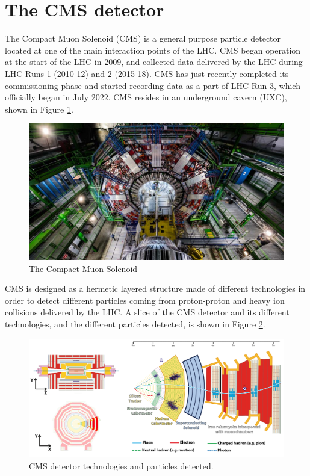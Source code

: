 
\section{The CMS detector} \label{sec:CMS}

The Compact Muon Solenoid (CMS) is a general purpose particle detector located at one of the main interaction points of the LHC. CMS began operation at the start of the LHC in 2009, and collected data delivered by the LHC during LHC Runs 1 (2010-12) and 2 (2015-18). CMS has just recently completed its commissioning phase and started recording data as a part of LHC Run 3, which officially began in July 2022. CMS resides in an underground cavern (UXC), shown in Figure \ref{fig:CMS_image}.

\begin{figure}[H]
    \centering
    \includegraphics[width=\textwidth]{Images/CMS/CMS.jpg}
    \caption{The Compact Muon Solenoid}
    \label{fig:CMS_image}
\end{figure}

CMS is designed as a hermetic layered structure made of different technologies in order to detect different particles coming from proton-proton and heavy ion collisions delivered by the LHC. A slice of the CMS detector and its different technologies, and the different particles detected, is shown in Figure \ref{fig:CMS_PF}.

\begin{figure}[H]
    \centering
    \includegraphics[width=\textwidth]{Images/CMS/CMS_PF.png}
    \caption{CMS detector technologies and particles detected.}
    \label{fig:CMS_PF}
\end{figure}

